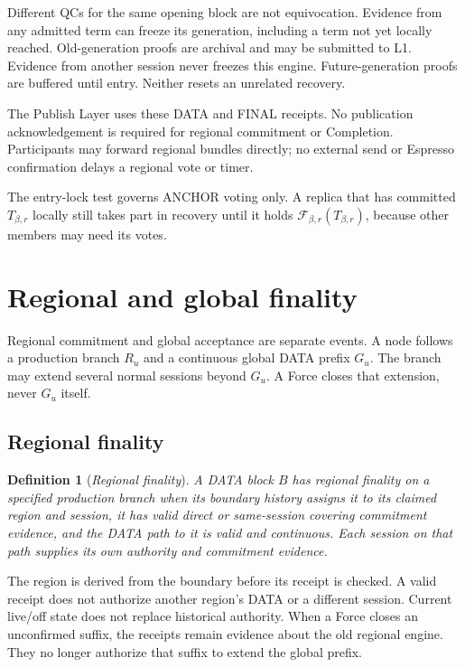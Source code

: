 \documentclass[11pt,a4paper]{article}
\newcommand{\RR}[1]{{\color{rrRed}#1}}
\newcommand{\FC}{\mathcal F}
\newcommand{\defterm}[1]{\textcolor{rrBlue}{\textit{#1}}}
\newtheorem{definition}{Definition}[section]
\begin{document}
Different QCs for the same opening block are not equivocation. Evidence
from any admitted term can freeze its generation, including a term not
yet locally reached. Old-generation proofs are archival and may be
submitted to L1. \RR{Evidence from another session never freezes this
engine.} Future-generation proofs are buffered until entry. Neither
resets an unrelated recovery.

The Publish Layer uses these DATA and FINAL receipts. No publication
acknowledgement is required for regional commitment or Completion.
Participants may forward regional bundles directly; no external send
or Espresso confirmation delays a regional vote or timer.

The entry-lock test governs ANCHOR voting only. A replica that has
committed $T_{\beta,r}$ locally still takes part in recovery until it holds
$\FC_{\beta,r}(T_{\beta,r})$, because other members may need its votes.

\section{Regional and global finality}
\label{sec:external}
Regional commitment and global acceptance are separate events.
A node follows a production branch $R_u$ and a continuous global DATA
prefix $G_u$. The branch may extend several normal sessions beyond
$G_u$. A Force closes that extension, never $G_u$ itself.

\subsection{Regional finality}
\label{sec:regional-finality}
\begin{definition}[\defterm{Regional finality}]
\label{def:regional-finality}
A DATA block $B$ has regional finality on a specified production branch
when its boundary history assigns it to its claimed region and session,
it has valid direct or same-session covering commitment evidence, and
the DATA path to it is valid and continuous. Each session on that path
supplies its own authority and commitment evidence.
\end{definition}
The region is derived from the boundary before its receipt is checked.
A valid receipt does not authorize another region's DATA or a different
session. Current live/off state does not replace historical authority.
When a Force closes an unconfirmed suffix, the receipts remain evidence
about the old regional engine. They no longer authorize that suffix to
extend the global prefix.
\end{document}
